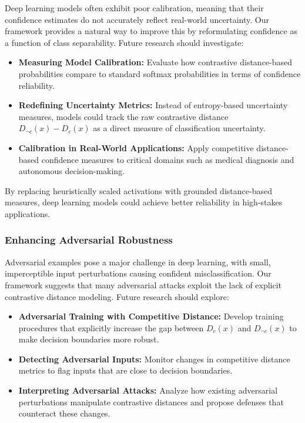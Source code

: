 Deep learning models often exhibit poor calibration, meaning that their confidence estimates do not accurately reflect real-world uncertainty. Our framework provides a natural way to improve this by reformulating confidence as a function of class separability. Future research should investigate:

\begin{itemize}
    \item \textbf{Measuring Model Calibration:} Evaluate how contrastive distance-based probabilities compare to standard softmax probabilities in terms of confidence reliability.
    \item \textbf{Redefining Uncertainty Metrics:} Instead of entropy-based uncertainty measures, models could track the raw contrastive distance \( D_{\neg c}(x) - D_c(x) \) as a direct measure of classification uncertainty.
    \item \textbf{Calibration in Real-World Applications:} Apply competitive distance-based confidence measures to critical domains such as medical diagnosis and autonomous decision-making.
\end{itemize}

By replacing heuristically scaled activations with grounded distance-based measures, deep learning models could achieve better reliability in high-stakes applications.

\subsubsection{Enhancing Adversarial Robustness}

Adversarial examples pose a major challenge in deep learning, with small, imperceptible input perturbations causing confident misclassification. Our framework suggests that many adversarial attacks exploit the lack of explicit contrastive distance modeling. Future research should explore:

\begin{itemize}
    \item \textbf{Adversarial Training with Competitive Distance:} Develop training procedures that explicitly increase the gap between \( D_c(x) \) and \( D_{\neg c}(x) \) to make decision boundaries more robust.
    \item \textbf{Detecting Adversarial Inputs:} Monitor changes in competitive distance metrics to flag inputs that are close to decision boundaries.
    \item \textbf{Interpreting Adversarial Attacks:} Analyze how existing adversarial perturbations manipulate contrastive distances and propose defenses that counteract these changes.
\end{itemize}

